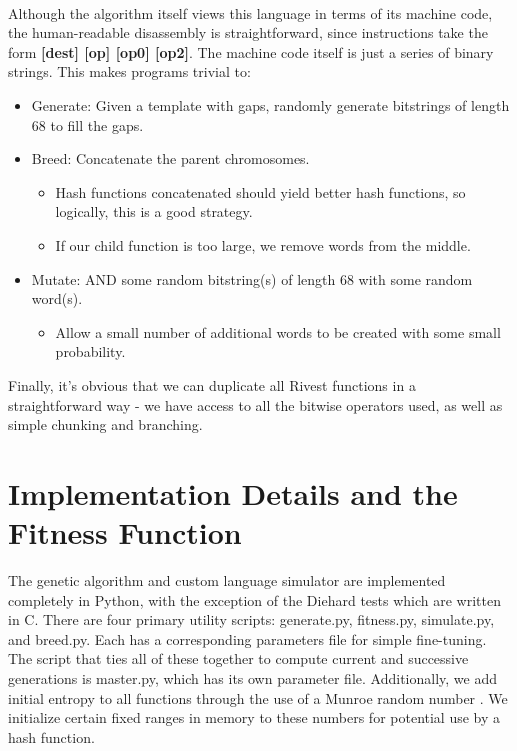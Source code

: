 \documentclass{article}
\begin{document}
\paragraph{}
Although the algorithm itself views this language in terms of its machine code, the human-readable disassembly is straightforward, since instructions take the form \textbf{[dest] [op] [op0] [op2]}. The machine code itself is just a series of binary strings. This makes programs trivial to:
	\begin{itemize}
	\item Generate: Given a template with gaps, randomly generate bitstrings of length 68 to fill the gaps.
	\item Breed: Concatenate the parent chromosomes.
		\begin{itemize}
			\item Hash functions concatenated should yield better hash functions, so logically, this is a good strategy.
			\item If our child function is too large, we remove words from the middle.
		\end{itemize}
	\item Mutate: AND some random bitstring(s) of length 68 with some random word(s).
		\begin{itemize}
		\item Allow a small number of additional words to be created with some small probability.
		\end{itemize}
	\end{itemize}

Finally, it's obvious that we can duplicate all Rivest functions in a straightforward way - we have access to all the bitwise operators used, as well as simple chunking and branching.

\section{Implementation Details and the Fitness Function}
The genetic algorithm and custom language simulator are implemented completely in Python, with the exception of the Diehard tests \cite{Diehard} which are written in C. There are four primary utility scripts: generate.py, fitness.py, simulate.py, and breed.py. Each has a corresponding parameters file for simple fine-tuning. The script that ties all of these together to compute current and successive generations is master.py, which has its own parameter file. Additionally, we add initial entropy to all functions through the use of a Munroe random number \cite{Munroe}. We initialize certain fixed ranges in memory to these numbers for potential use by a hash function.
\end{document}
